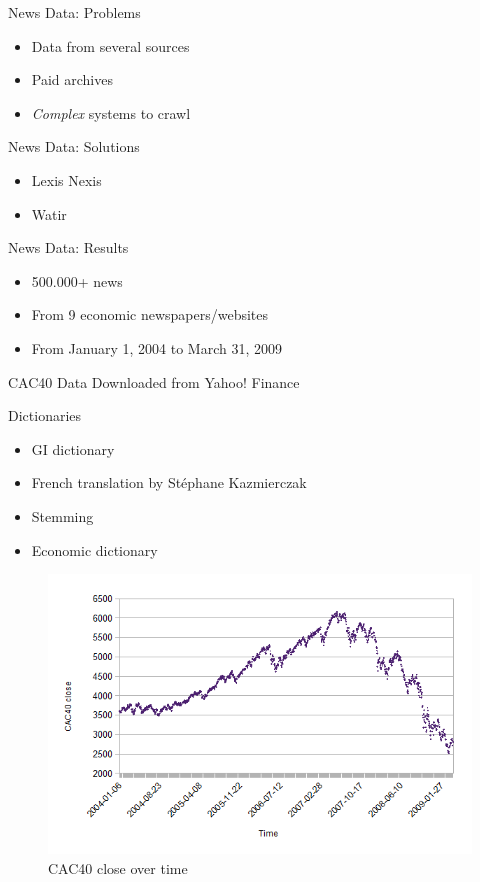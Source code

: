 \documentclass{beamer}
\newcommand{\st}[0]{\superscript{st}}
\begin{document}
\begin{frame}{News Data: Problems}
	\begin{itemize}
		\item Data from several sources
		\item Paid archives
		\item \emph{Complex} systems to crawl
	\end{itemize}
\end{frame}

\begin{frame}{News Data: Solutions}
	\begin{itemize}
		\item Lexis Nexis
		\item Watir
	\end{itemize}
\end{frame}

\begin{frame}{News Data: Results}
	\begin{itemize}
		\item 500.000+ news
		\item From 9 economic newspapers/websites
		\item From January 1\st, 2004 to March 31\st, 2009
	\end{itemize}
\end{frame}

\begin{frame}{CAC40 Data}
	Downloaded from Yahoo! Finance
\end{frame}

\begin{frame}{Dictionaries}
	\begin{itemize}
		\item GI dictionary
		\item French translation by Stéphane Kazmierczak
		\item Stemming
		\item Economic dictionary
	\end{itemize}
\end{frame}

\begin{frame}
	\begin{figure}
		\caption{CAC40 close over time}
		\includegraphics[scale=.5]{plots/time/cac.png}
	\end{figure}
\end{frame}
\end{document}
